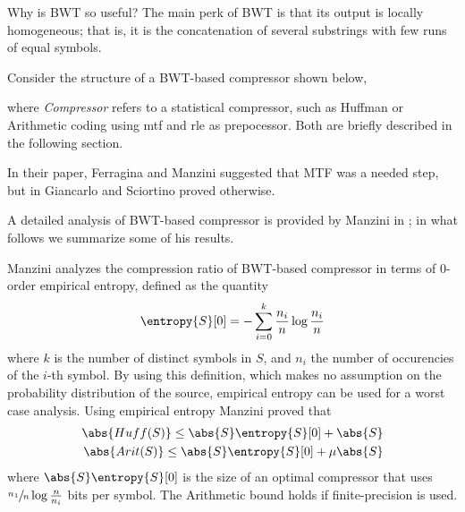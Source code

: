 \documentclass{subfiles}
\begin{document}
    Why is BWT so useful? The main perk of BWT is that its output is locally 
        homogeneous; that is, it is the concatenation of several substrings
        with few runs of equal symbols.

    Consider the structure of a BWT-based compressor shown below,
        
        where \emph{Compressor} refers to a statistical compressor, 
        such as Huffman or Arithmetic coding using \gls{mtf} and \gls{rle}
        as prepocessor. Both are briefly described in the following section.
        
    In their paper, Ferragina and Manzini suggested that MTF was a needed step,
        but in \cite{giacarloSciortino2003} Giancarlo and Sciortino proved otherwise.

    A detailed analysis of BWT-based compressor is provided by Manzini in \cite{manzini2001};
        in what follows we summarize some of his results. 

    Manzini analyzes the compression ratio of BWT-based compressor in terms of 
        0-order empirical entropy, defined as the quantity 
        \[
            \entropy{S}[0] = - \sum_{i = 0}^{k} {\frac{n_{i}}{n} \log \frac{n_{i}}{n}}
        \]
        where \(k\) is the number of distinct symbols in \(S\), 
        and \(n_{i}\) the number of occurencies of the \(i\)-th symbol.
        By using this definition, which makes no assumption on the probability distribution 
        of the source, empirical entropy can be used for a worst case analysis.
        Using empirical entropy Manzini proved that 
        \[\begin{aligned}
            \abs{Huff(S)} \le \abs{S}\entropy{S}[0] + \abs{S} \\
            \abs{Arit(S)} \le \abs{S}\entropy{S}[0] + \mu\abs{S} \\
        \end{aligned}\]
        where \(\abs{S}\entropy{S}[0]\) is the size of an optimal compressor 
        that uses \(\sfrac{n_{1}}{n} \log \frac{n}{n_{i}}\) bits per symbol. 
        The Arithmetic bound holds if finite-precision is used.
\end{document}
